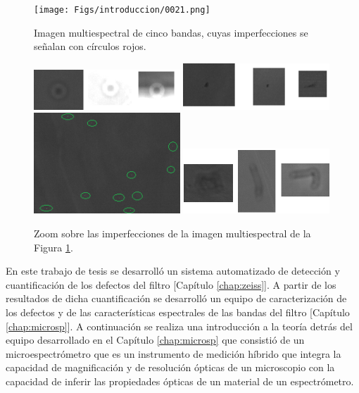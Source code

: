 \begin{figure}[H]
	\centering
	\texttt{[image: Figs/introduccion/0021.png]}
	\caption{Imagen multiespectral de cinco bandas, cuyas imperfecciones se señalan con círculos rojos.}
	\label{fig:speus}
\end{figure}

\begin{figure}[H]
\includegraphics[width=0.49\textwidth]{Figs/introduccion/agimgg.png}\hfill
\includegraphics[width=0.49\textwidth]{Figs/introduccion/manc.png}
\\[\smallskipamount]
\includegraphics[width=0.49\textwidth]{Figs/introduccion/agjj.png}\hfill
\includegraphics[width=0.49\textwidth]{Figs/introduccion/def2.png}
\caption{Zoom sobre las imperfecciones de la imagen multiespectral de la Figura \ref{fig:speus}.}
\label{fig:imgdefs}
\end{figure}

En este trabajo de tesis se desarrolló un sistema automatizado de detección y cuantificación de los defectos del filtro [Capítulo \ref{chap:zeiss}]. A partir de los resultados de dicha cuantificación se desarrolló un equipo de caracterización de los defectos y de las características espectrales de las bandas del filtro [Capítulo \ref{chap:microsp}]. A continuación se realiza una introducción a la teoría detrás del equipo desarrollado en el Capítulo \ref{chap:microsp} que consistió de un microespectrómetro que es un instrumento de medición híbrido que integra la capacidad de magnificación y de resolución ópticas de un microscopio con la capacidad de inferir las propiedades ópticas de un material de un espectrómetro.


